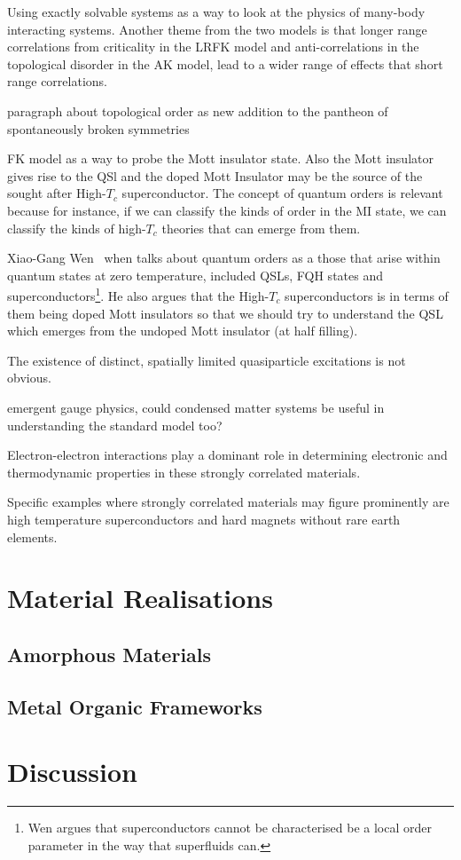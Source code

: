 Using exactly solvable systems as a way to look at the physics of many-body interacting systems. Another theme from the two models is that longer range correlations from criticality in the LRFK model and anti-correlations in the topological disorder in the AK model, lead to a wider range of effects that short range correlations.

paragraph about topological order as new addition to the pantheon of spontaneously broken symmetries

FK model as a way to probe the Mott insulator state. Also the Mott insulator gives rise to the QSl and the doped Mott Insulator may be the source of the sought after High-\(T_c\) superconductor. The concept of quantum orders is relevant because for instance, if we can classify the kinds of order in the MI state, we can classify the kinds of high-\(T_c\) theories that can emerge from them.

Xiao-Gang Wen~\autocite{wenQuantumOrdersSymmetric2002} when talks about quantum orders as a those that arise within quantum states at zero temperature, included QSLs, FQH states and superconductors\footnote{Wen argues that superconductors cannot be characterised be a local order parameter in the way that superfluids can.}. He also argues that the High-\(T_c\) superconductors is in terms of them being doped Mott insulators so that we should try to understand the QSL which emerges from the undoped Mott insulator (at half filling).

The existence of distinct, spatially limited quasiparticle excitations is not obvious.

emergent gauge physics, could condensed matter systems be useful in understanding the standard model too?

Electron-electron interactions play a dominant role in determining electronic and thermodynamic properties in these strongly correlated materials.

Specific examples where strongly correlated materials may figure prominently are high temperature superconductors and hard magnets without rare earth elements.

\hypertarget{material-realisations}{%
\section{Material Realisations}\label{material-realisations}}

\hypertarget{amorphous-materials}{%
\subsection{Amorphous Materials}\label{amorphous-materials}}

\hypertarget{metal-organic-frameworks}{%
\subsection{Metal Organic Frameworks}\label{metal-organic-frameworks}}

\hypertarget{discussion}{%
\section{Discussion}\label{discussion}}
